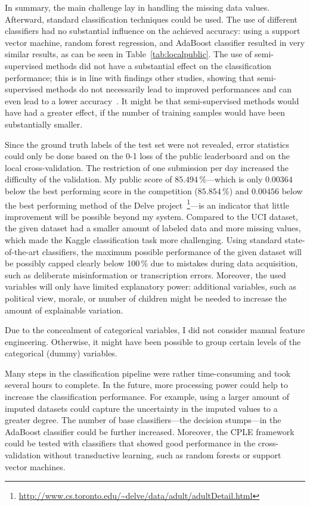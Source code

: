 In summary, the main challenge lay in handling the missing data values.  Afterward, standard classification techniques could be used. The use of different classifiers had no substantial influence on the achieved accuracy: using a support vector machine, random forest regression, and AdaBoost
classifier resulted in very similar results, as can be seen in Table~\ref{tab:localpublic}. The use of semi-supervised methods did not have a substantial effect on the classification performance; this is in line with findings other studies, showing that semi-supervised methods do not necessarily lead to improved performances and can even lead to a lower accuracy~\cite{zhu2005semi}. It might be that semi-supervised methods would have had a greater effect, if the number of training samples would have been substantially smaller. 

Since the ground truth labels of the test set were not revealed, error statistics could only be done based on the 0-1 loss of the public leaderboard and on the local cross-validation. The restriction of one submission per day increased the difficulty of the validation. My public score of $85.494\,\%$---which is only $0.00364$ below the best performing score in the competition ($85.854\,\%$) and $0.00456$ below the best performing method of the Delve project~\footnote{\url{http://www.cs.toronto.edu/~delve/data/adult/adultDetail.html}}---is an indicator that little improvement will be possible beyond my system. Compared to the UCI dataset, the given dataset had a smaller amount of labeled data and more missing values, which made the Kaggle classification task more challenging. Using standard state-of-the-art classifiers, the maximum possible performance of the given dataset will be possibly capped clearly below 100\,\% due to mistakes during data acquisition, such as deliberate misinformation or transcription errors. Moreover, the used variables will only have limited explanatory power:  additional variables, such as political view, morale, or number of children might be needed to increase the amount of explainable variation.     

Due to the concealment of categorical variables, I did not consider manual feature engineering. Otherwise, it might have been possible to group certain levels of the categorical (dummy) variables.

Many steps in the classification pipeline were rather time-consuming and took several hours to complete. In the future, more processing power could help to increase the classification performance. For example, using a larger amount of imputed datasets could capture the uncertainty in the imputed values to a greater degree. The number of base classifiers---the decision stumps---in the AdaBoost classifier could be further increased. Moreover, the CPLE framework could be tested with classifiers that showed good performance in the cross-validation without transductive learning, such as random forests or support vector machines.    